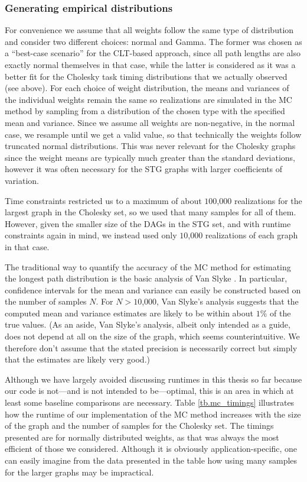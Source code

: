 \documentclass[12pt]{article}
\begin{document}
\subsubsection{Generating empirical distributions}
\label{subsubsect.generating}

For convenience we assume that all weights follow the same type of distribution and consider two different choices: normal and Gamma. The former was chosen as a ``best-case scenario'' for the CLT-based approach, since all path lengths are also exactly normal themselves in that case, while the latter is considered as it was a better fit for the Cholesky task timing distributions that we actually observed (see above). For each choice of weight distribution, the means and variances of the individual weights remain the same so realizations are simulated in the MC method by sampling from a distribution of the chosen type with the specified mean and variance. Since we assume all weights are non-negative, in the normal case, we resample until we get a valid value, so that technically the weights follow truncated normal distributions. This was never relevant for the Cholesky graphs since the weight means are typically much greater than the standard deviations, however it was often necessary for the STG graphs with larger coefficients of variation.     

Time constraints restricted us to a maximum of about $100$,$000$ realizations for the largest graph in the Cholesky set, so we used that many samples for all of them. However, given the smaller size of the DAGs in the STG set, and with runtime constraints again in mind, we instead used only $10$,$000$ realizations of each graph in that case.

The traditional way to quantify the accuracy of the MC method for estimating the longest path distribution is the basic analysis of Van Slyke \cite{van63}. In particular, confidence intervals for the mean and variance can easily be constructed based on the number of samples $N$. For $N > 10$,$000$, Van Slyke's analysis suggests that the computed mean and variance estimates are likely to be within about $1\%$ of the true values. (As an aside, Van Slyke's analysis, albeit only intended as a guide, does not depend at all on the size of the graph, which seems counterintuitive. We therefore don't assume that the stated precision is necessarily correct but simply that the estimates are likely very good.)

Although we have largely avoided discussing runtimes in this thesis so far because our code is not---and is not intended to be---optimal, this is an area in which at least some baseline comparisons are necessary. Table \ref{tb.mc_timings} illustrates how the runtime of our implementation of the MC method increases with the size of the graph and the number of samples for the Cholesky set. The timings presented are for normally distributed weights, as that was always the most efficient of those we considered. Although it is obviously application-specific, one can easily imagine from the data presented in the table how using many samples for the larger graphs may be impractical. 
\end{document}
